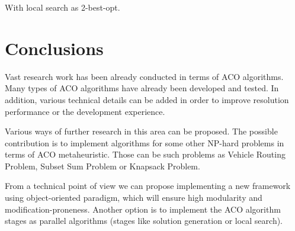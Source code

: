 \documentclass[12pt]{article}
\begin{document}
With local search as 2-best-opt.

\section{Conclusions}

Vast research work has been already conducted in terms of ACO algorithms. Many types of ACO algorithms have already been developed and tested. In addition, various technical details can be added in order to improve resolution performance or the development experience. 

Various ways of further research in this area can be proposed. The possible contribution is to implement algorithms for some other NP-hard problems in terms of ACO metaheuristic. Those can be such problems as Vehicle Routing Problem, Subset Sum Problem or Knapsack Problem.

From a technical point of view we can propose implementing a new framework using object-oriented paradigm, which will ensure high modularity and modification-proneness. Another option is to implement the ACO algorithm stages as parallel algorithms (stages like solution generation or local search). 
\end{document}
